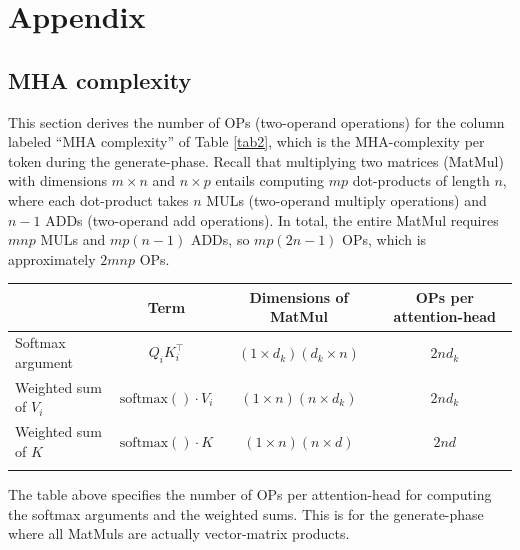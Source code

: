 \documentclass{article}
\def\fline{\Xhline{2\arrayrulewidth}} %
\begin{document}
\section*{Appendix}

\subsection*{MHA complexity}
This section derives the number of OPs (two-operand operations) for the column labeled ``MHA complexity'' of Table \ref{tab2}, which is the MHA-complexity per token during the generate-phase. Recall that multiplying two matrices (MatMul) with dimensions $m \times n$ and $n \times p$ entails computing $m p$ dot-products of length $n$, where each dot-product takes $n$ MULs (two-operand multiply operations) and $n-1$ ADDs (two-operand add operations). In total, the entire MatMul requires $mnp$ MULs and $mp(n-1)$ ADDs, so $mp(2n-1)$ OPs, which is approximately $2mnp$ OPs.
\begingroup \renewcommand{\arraystretch}{1.3} %
\begin{table}[h!] \centering \begin{tabular}{lccc} \fline
                         & Term & Dimensions of MatMul   & OPs per attention-head                    \\ \hline
  Softmax argument       & $Q_i K_i^\top$                & $(1 \times d_k)(d_k \times n)$   & $2nd_k$ \\
  Weighted sum of $V_i$  & $\text{softmax}() \cdot V_i$  & $(1 \times n)(n \times d_k)$    & $2nd_k$ \\
  Weighted sum of $K$    & $\text{softmax}() \cdot K$    & $(1 \times n)(n \times d)$      & $2nd$   \\ \fline
\end{tabular} \end{table} \endgroup

The table above specifies the number of OPs per attention-head for computing the softmax arguments and the weighted sums. This is for the generate-phase where all MatMuls are actually vector-matrix products.
\end{document}
